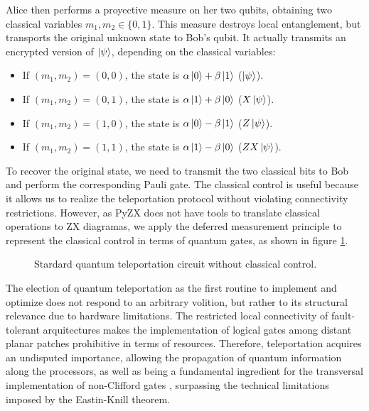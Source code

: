 \documentclass[12pt, twoside, openany]{book}
\begin{document}
Alice then performs a proyective measure on her two qubits, obtaining two classical variables $m_1, m_2 \in \{ 0,1 \} $. This measure destroys local entanglement, but transports the original unknown state to Bob's qubit. It actually transmits an encrypted version of $\ket{\psi}$, depending on the classical variables:
\begin{itemize}
    \item If $(m_1,m_2) = (0,0)$, the state is $\alpha \ket{0} + \beta \ket{1}$ ($\ket{\psi}$).
    \item If $(m_1,m_2) = (0,1)$, the state is $\alpha \ket{1} + \beta \ket{0}$ ($X\ket{\psi}$).
    \item If $(m_1,m_2) = (1,0)$, the state is $\alpha \ket{0} - \beta \ket{1}$ ($Z\ket{\psi}$).
    \item If $(m_1,m_2) = (1,1)$, the state is $\alpha \ket{1} - \beta \ket{0}$ ($ZX\ket{\psi}$).
\end{itemize}

To recover the original state, we need to transmit the two classical bits to Bob and perform the corresponding Pauli gate. The classical control is useful because it allows us to realize the teleportation protocol without violating connectivity restrictions. However, as PyZX does not have tools to translate classical operations to ZX diagramas, we apply the deferred measurement principle \cite{NielsenChuang2010} to represent the classical control in terms of quantum gates, as shown in figure \ref{fig:teleportation_circuit_CZ}.

\begin{figure} [ht]
    \centering
    
    \caption{Stardard quantum teleportation circuit without classical control.}
    \label{fig:teleportation_circuit_CZ}
\end{figure}

The election of quantum teleportation as the first routine to implement and optimize does not respond to an arbitrary volition, but rather to its structural relevance due to hardware limitations. The restricted local connectivity of fault-tolerant arquitectures makes the implementation of logical gates among distant planar patches prohibitive in terms of resources. Therefore, teleportation acquires an undisputed importance, allowing the propagation of quantum information along the processors, as well as being a fundamental ingredient for the transversal implementation of non-Clifford gates \cite{deBeaudrap2020}, surpassing the technical limitations imposed by the Eastin-Knill theorem.
\end{document}
